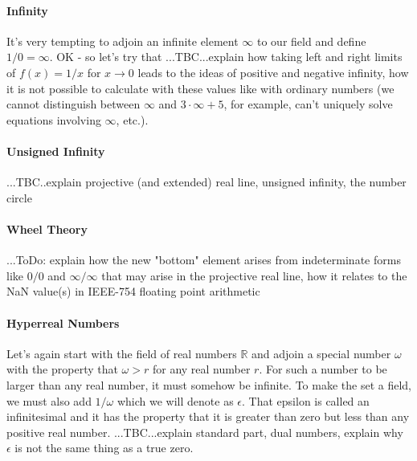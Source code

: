 \paragraph{Infinity} It's very tempting to adjoin an infinite element $\infty$ to our field and define $1/0 = \infty$. OK - so let's try that ...TBC...explain how taking left and right limits of $f(x) = 1/x$ for $x \rightarrow 0$ leads to the ideas of positive and negative infinity, how it is not possible to calculate with these values like with ordinary numbers (we cannot distinguish between $\infty$ and $3 \cdot \infty + 5$, for example, can't uniquely solve equations involving $\infty$, etc.).

\paragraph{Unsigned Infinity}...TBC..explain projective (and extended) real line, unsigned infinity, the number circle





\paragraph{Wheel Theory}...ToDo: explain how the new "bottom" element arises from indeterminate forms like $0/0$ and $\infty / \infty$ that may arise in the projective real line, how it relates to the NaN value(s) in IEEE-754 floating point arithmetic




\paragraph{Hyperreal Numbers} Let's again start with the field of real numbers $\mathbb{R}$ and adjoin a special number $\omega$ with the property that $\omega > r$ for any real number $r$. For such a number to be larger than any real number, it must somehow be infinite. To make the set a field, we must also add $1/\omega$ which we will denote as $\epsilon$. That epsilon is called an infinitesimal and it has the property that it is greater than zero but less than any positive real number.  ...TBC...explain standard part, dual numbers, explain why $\epsilon$ is not the same thing as a true zero.

